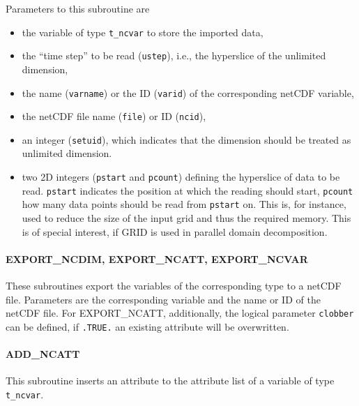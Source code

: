 \documentclass[11pt,twoside]{article}
\begin{document}
Parameters to this subroutine are 
\begin{itemize}
\item the variable of type \verb|t_ncvar| to store the imported data, 
\item the ``time step'' to be read (\verb|ustep|), i.e., the
hyperslice of the unlimited dimension, 
\item the name (\verb|varname|)
 or the ID (\verb|varid|)  of the corresponding netCDF variable,
\item  the netCDF file name  (\verb|file|) or ID (\verb|ncid|),
\item  an integer (\verb|setuid|), which indicates that the dimension
should be treated as unlimited dimension.
\item  two 2D integers (\verb|pstart| and \verb|pcount|) defining the
hyperslice 
of data to be read. \verb|pstart| indicates the position at which the reading
should start,  \verb|pcount| how many data points should be read from 
 \verb|pstart| on. This is, for instance, used to reduce the size of
 the input grid and thus the required memory. This is of special
 interest, if GRID is used in parallel domain decomposition.
\end{itemize}
\paragraph{EXPORT\_NCDIM, EXPORT\_NCATT, EXPORT\_NCVAR\\\label{EXPNC}}

These subroutines export the variables of the corresponding type to a 
netCDF file. Parameters are the corresponding variable and the name or ID of the
netCDF file. For EXPORT\_NCATT, additionally, the logical parameter 
\verb|clobber| can be defined, if \verb|.TRUE.| an existing attribute
will be overwritten. 

\paragraph{ADD\_NCATT\\\label{ADDNCATT}}

This subroutine inserts an attribute to the attribute list of a variable of
type \verb|t_ncvar|.
\end{document}
